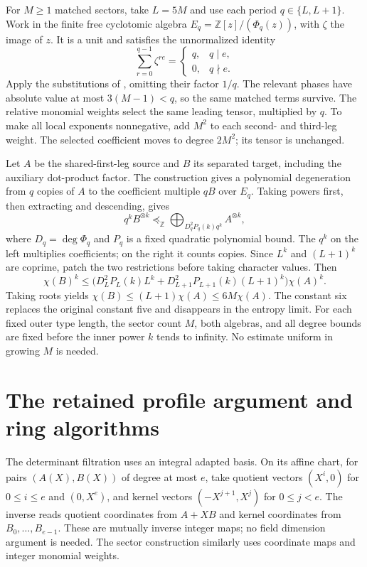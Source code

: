 \documentclass[11pt]{article}
\theoremstyle{remark}
\newcommand{\Z}{\mathbb Z}
\newcommand{\res}{\preceq}
\newcommand{\tp}[1]{^{\otimes #1}}
\numberwithin{equation}{section}
\begin{document}
For $M\geq1$ matched sectors, take $L=5M$ and use each period
$q\in\{L,L+1\}$. Work in the finite free cyclotomic algebra
$E_q=\Z[z]/(\Phi_q(z))$, with $\zeta$ the image of $z$. It is a unit
and satisfies the unnormalized identity
\[
 \sum_{r=0}^{q-1}\zeta^{re}=
 \begin{cases}q,&q\mid e,\\0,&q\nmid e.\end{cases}
\]
Apply the substitutions of \cite[Proposition~3.1]{OAI}, omitting their
factor $1/q$. The relevant phases have absolute value at most
$3(M-1)<q$, so the same matched terms survive. The relative monomial
weights select the same leading tensor, multiplied by $q$. To make all
local exponents nonnegative, add $M^2$ to each second- and third-leg
weight. The selected coefficient moves to degree $2M^2$; its tensor is
unchanged.

Let $A$ be the shared-first-leg source and $B$ its separated target,
including the auxiliary dot-product factor. The construction gives a
polynomial degeneration from $q$ copies of $A$ to the coefficient
multiple $qB$ over $E_q$. Taking powers first, then extracting and
descending, gives
\[
 q^kB\tp{k}\res_\Z
 \bigoplus_{D_q^2 P_q(k)q^k} A\tp{k},
\]
where $D_q=\deg\Phi_q$ and $P_q$ is a fixed quadratic polynomial bound.
The $q^k$ on the left multiplies coefficients; on the right it counts
copies. Since $L^k$ and $(L+1)^k$ are coprime, patch the two restrictions
before taking character values. Then
\[
 \chi(B)^k\leq
 \bigl(D_L^2P_L(k)L^k+D_{L+1}^2P_{L+1}(k)(L+1)^k\bigr)\chi(A)^k.
\]
Taking roots yields $\chi(B)\leq(L+1)\chi(A)\leq6M\chi(A)$.
The constant six replaces the original constant five and disappears in
the entropy limit. For each fixed outer type length, the sector count
$M$, both algebras, and all degree bounds are fixed before the inner
power $k$ tends to infinity. No estimate uniform in growing $M$ is needed.

\section{The retained profile argument and ring algorithms}

The determinant filtration uses an integral adapted basis. On its affine
chart, for pairs $(A(X),B(X))$ of degree at most $e$, take quotient
vectors $(X^i,0)$ for $0\leq i\leq e$ and $(0,X^e)$, and kernel vectors
$(-X^{j+1},X^j)$ for $0\leq j<e$. The inverse reads quotient coordinates
from $A+XB$ and kernel coordinates from $B_0,\ldots,B_{e-1}$.
These are mutually inverse integer maps; no field dimension argument is
needed. The sector construction similarly uses coordinate maps and
integer monomial weights.
\end{document}
